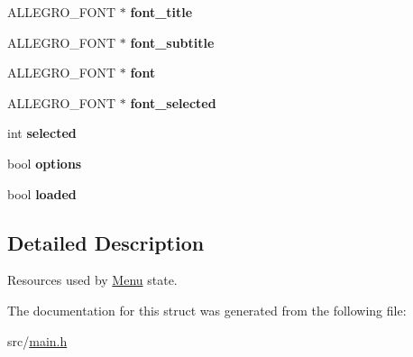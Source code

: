 \begin{DoxyCompactItemize}
\item 
\hypertarget{structMenu_aac0297cac51099ec75020a510a6dcbb3}{\-A\-L\-L\-E\-G\-R\-O\-\_\-\-F\-O\-N\-T $\ast$ {\bfseries font\-\_\-title}}\label{structMenu_aac0297cac51099ec75020a510a6dcbb3}

\item 
\hypertarget{structMenu_a18d7377e798bac336e55e253243d4e13}{\-A\-L\-L\-E\-G\-R\-O\-\_\-\-F\-O\-N\-T $\ast$ {\bfseries font\-\_\-subtitle}}\label{structMenu_a18d7377e798bac336e55e253243d4e13}

\item 
\hypertarget{structMenu_aa4e0229cb315ef9e0ea90263b26a37f8}{\-A\-L\-L\-E\-G\-R\-O\-\_\-\-F\-O\-N\-T $\ast$ {\bfseries font}}\label{structMenu_aa4e0229cb315ef9e0ea90263b26a37f8}

\item 
\hypertarget{structMenu_a577ad17dfddafaae41dde63ca7970003}{\-A\-L\-L\-E\-G\-R\-O\-\_\-\-F\-O\-N\-T $\ast$ {\bfseries font\-\_\-selected}}\label{structMenu_a577ad17dfddafaae41dde63ca7970003}

\item 
\hypertarget{structMenu_a608e2768a5458057048bf1c7ab9a81aa}{int {\bfseries selected}}\label{structMenu_a608e2768a5458057048bf1c7ab9a81aa}

\item 
\hypertarget{structMenu_a239080567caece4982b2edd716c57223}{bool {\bfseries options}}\label{structMenu_a239080567caece4982b2edd716c57223}

\item 
\hypertarget{structMenu_afd245b822f2805677609fc0f78ee59ac}{bool {\bfseries loaded}}\label{structMenu_afd245b822f2805677609fc0f78ee59ac}

\end{DoxyCompactItemize}


\subsection{\-Detailed \-Description}
\-Resources used by \hyperlink{structMenu}{\-Menu} state. 

\-The documentation for this struct was generated from the following file\-:\begin{DoxyCompactItemize}
\item 
src/\hyperlink{main_8h}{main.\-h}\end{DoxyCompactItemize}
